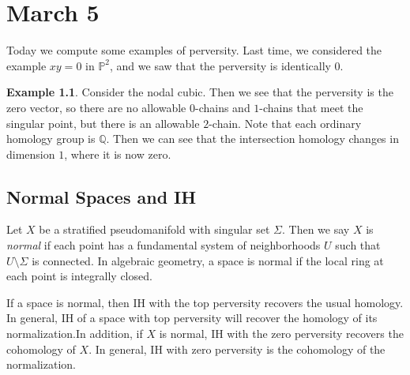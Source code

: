 \documentclass[leqno, openany]{memoir}
\theoremstyle{definition}
\newtheorem{exm}[thm]{Example}
\theoremstyle{remark}
\theoremstyle{plain}
\theoremstyle{definition}
\theoremstyle{remark}
\newcommand{\Q}{\mathbb{Q}}
\renewcommand{\P}{\mathbb{P}}
\begin{document}
\chapter{March 5}%
\label{cha:march_5}

Today we compute some examples of perversity. Last time, we considered the example $xy = 0$ in $\P^2$, and we saw that the perversity is identically $0$. 

\begin{exm}
    Consider the nodal cubic. Then we see that the perversity is the zero vector, so there are no allowable $0$-chains and $1$-chains that meet the singular point, but there is an allowable $2$-chain. Note that each ordinary homology group is $\Q$. Then we can see that the intersection homology changes in dimension $1$, where it is now zero.
\end{exm}

\section{Normal Spaces and IH}%
\label{sec:normal_spaces_and_ih}

Let $X$ be a stratified pseudomanifold with singular set $\Sigma$. Then we say $X$ is \textit{normal} if each point has a fundamental system of neighborhoods $U$ such that $U \setminus \Sigma$ is connected. In algebraic geometry, a space is normal if the local ring at each point is integrally closed. 

If a space is normal, then IH with the top perversity recovers the usual homology. In general, IH of a space with top perversity will recover the homology of its normalization.In addition, if $X$ is normal, IH with the zero perversity recovers the cohomology of $X$. In general, IH with zero perversity is the cohomology of the normalization.
\end{document}
